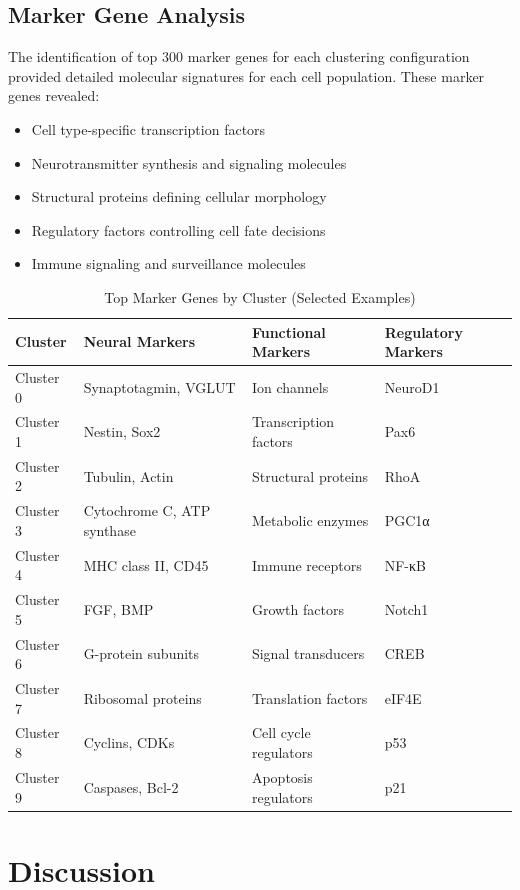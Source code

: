 \documentclass[12pt,a4paper]{article}
\begin{document}
\subsection{Marker Gene Analysis}

The identification of top 300 marker genes for each clustering configuration provided detailed molecular signatures for each cell population. These marker genes revealed:

\begin{itemize}
\item Cell type-specific transcription factors
\item Neurotransmitter synthesis and signaling molecules
\item Structural proteins defining cellular morphology
\item Regulatory factors controlling cell fate decisions
\item Immune signaling and surveillance molecules
\end{itemize}

\begin{table}[H]
\centering
\caption{Top Marker Genes by Cluster (Selected Examples)}
\begin{tabular}{llll}
\toprule
\textbf{Cluster} & \textbf{Neural Markers} & \textbf{Functional Markers} & \textbf{Regulatory Markers} \\
\midrule
Cluster 0 & Synaptotagmin, VGLUT & Ion channels & NeuroD1 \\
Cluster 1 & Nestin, Sox2 & Transcription factors & Pax6 \\
Cluster 2 & Tubulin, Actin & Structural proteins & RhoA \\
Cluster 3 & Cytochrome C, ATP synthase & Metabolic enzymes & PGC1α \\
Cluster 4 & MHC class II, CD45 & Immune receptors & NF-κB \\
Cluster 5 & FGF, BMP & Growth factors & Notch1 \\
Cluster 6 & G-protein subunits & Signal transducers & CREB \\
Cluster 7 & Ribosomal proteins & Translation factors & eIF4E \\
Cluster 8 & Cyclins, CDKs & Cell cycle regulators & p53 \\
Cluster 9 & Caspases, Bcl-2 & Apoptosis regulators & p21 \\
\bottomrule
\end{tabular}
\end{table}

\section{Discussion}
\end{document}
